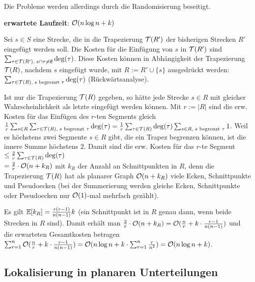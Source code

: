 Die Probleme werden allerdings durch die Randomisierung beseitigt.

\linie
\pagebreak

\textbf{erwartete Laufzeit}:
$\mathcal{O}(n \log n + k)$

\begin{Beweis}
    Sei $s \in S$ eine Strecke, die in die Trapezierung $\mathcal{T}(R')$ der bisherigen Strecken
    $R'$ eingefügt werden soll.
    Die Kosten für die Einfügung von $s$ in $\mathcal{T}(R')$ sind
    $\sum_{\tau \in \mathcal{T}(R'),\; s \cap \tau \not= \emptyset} \deg(\tau)$.
    Diese Kosten können in Abhängigkeit der Trapezierung $\mathcal{T}(R)$, nachdem $s$ eingefügt wurde,
    mit $R := R' \cup \{s\}$ ausgedrückt werden:
    $\sum_{\tau \in \mathcal{T}(R),\; s \text{ begrenzt } \tau} \deg(\tau)$
    (Rückwärtsanalyse).

    Ist nur die Trapezierung $\mathcal{T}(R)$ gegeben, so hätte jede Strecke $s \in R$ mit gleicher
    Wahrscheinlichkeit als letzte eingefügt werden können.
    Mit $r := |R|$ sind die erw. Kosten für das Einfügen des $r$-ten Segments gleich
    $\frac{1}{r} \sum_{s \in R} \sum_{\tau \in \mathcal{T}(R),\; s \text{ begrenzt } \tau} \deg(\tau)
    = \frac{1}{r} \sum_{\tau \in \mathcal{T}(R)} \deg(\tau) \sum_{s \in R,\; s \text{ begrenzt } \tau} 1$.
    Weil es höchstens zwei Segmente $s \in R$ gibt, die ein Trapez begrenzen können, ist
    die innere Summe höchstens $2$.
    Damit sind die erw. Kosten für das $r$-te Segment
    $\le \frac{2}{r} \sum_{\tau \in \mathcal{T}(R)} \deg(\tau)$\\
    $= \frac{2}{r} \cdot \mathcal{O}(n + k_R)$ mit $k_R$ der Anzahl an Schnittpunkten in $R$,
    denn die Trapezierung $\mathcal{T}(R)$ hat als planarer Graph $\mathcal{O}(n + k_R)$ viele Ecken, Schnittpunkte
    und Pseudoecken
    (bei der Summerierung werden gleiche Ecken, Schnittpunkte oder Pseudoecken nur $\mathcal{O}(1)$-mal
    mehrfach gezählt).

    Es gilt $\mathbb{E}[k_R] = \frac{r(r-1)}{n(n-1)} k$
    (ein Schnittpunkt ist in $R$ genau dann, wenn beide Strecken in $R$ sind).
    Damit erhält man $\frac{2}{r} \cdot \mathcal{O}(n + k_R)
    = \mathcal{O}(\frac{n}{r} + k \cdot \frac{r - 1}{n(n-1)})$
    und die erwarteten Gesamtkosten betragen
    $\sum_{r=1}^n \mathcal{O}(\frac{n}{r} + k \cdot \frac{r - 1}{n(n-1)})
    = \mathcal{O}(n \log n + k \cdot \sum_{r=1}^n \frac{r}{n^2}) = \mathcal{O}(n \log n + k)$.
\end{Beweis}

\subsection{%
    Lokalisierung in planaren Unterteilungen%
}

